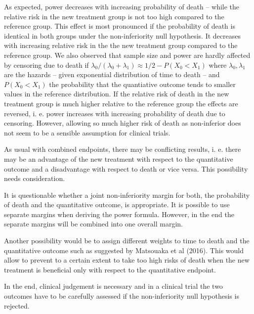 \documentclass[bimj,fleqn]{w-art}\usepackage[]{graphicx}\usepackage[]{color}
\theoremstyle{plain}
\theoremstyle{definition}
\begin{document}
As expected, power decreases with increasing probability of death -- while the
relative risk in the new treatment group is not too high compared to the reference
group. This effect is most pronounced if the probability of death is identical in
both groups under the non-inferiority null hypothesis.
It decreases with increasing relative risk in the the new treatment group compared
to the reference group. We also observed that sample size and power are hardly
affected by censoring due to death if $\lambda_0/(\lambda_0 + \lambda_1) \approx
1/2 - P(X_0 < X_1)$ where $\lambda_0, \lambda_1$ are the hazards -- given
exponential distribution of time to death -- and $P(X_0 < X_1)$ the probability
that the quantiative outcome tends to smaller values in the reference
distribution. If the relative risk of death in the new treatment group is much
higher relative to the reference group the effects are reversed, i. e. power
increases with increasing probability of death due to censoring. However, allowing
so much higher risk of death as non-inferior does not seem to be a sensible
assumption for clinical trials.

As usual with combined endpoints, there may be conflicting results, i. e. there
may be an advantage of the new treatment with respect to the quantitative outcome
and a disadvantage with respect to death or vice versa. This possibility needs
consideration.

It is questionable whether a joint non-inferiority margin for both, the
probability of death and the quantitative outcome, is appropriate. It is
possible to use separate margins when deriving the power formula. However, in
the end the separate margins will be combined into one overall margin.

Another possibility would be to assign different weights to time to death and
the quantitative outcome such as suggested by Matsouaka et al (2016). This would
allow to prevent to a certain extent to take too high risks of death when the
new treatment is beneficial only with respect to the quantitative endpoint.

In the end, clinical judgement is necessary and in a clinical trial the two
outcomes have to be carefully assessed if the non-inferiority null hypothesis is
rejected.



%
%
\end{document}
